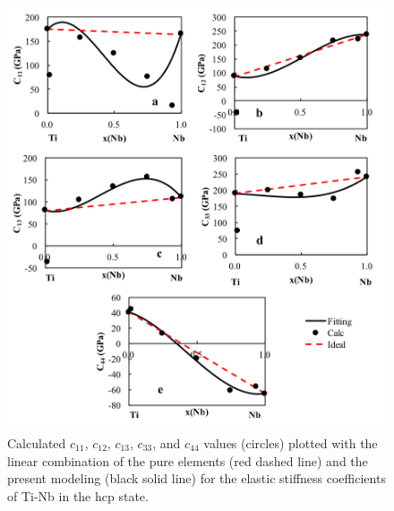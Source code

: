 \pagebreak
\begin{figure}[H]
	\centering
	\includegraphics[width=\textwidth]{Chapter-7/Figures/hcpe1.png}
	\caption{Calculated $c_{11}$, $c_{12}$, $c_{13}$, $c_{33}$, and $c_{44}$ values (circles) plotted with the linear combination of the pure elements (red dashed line) and the present modeling (black solid line) for the elastic stiffness coefficients of Ti-Nb in the hcp state.}
	\label{Ch7-figure:hcpe1}
\end{figure}

